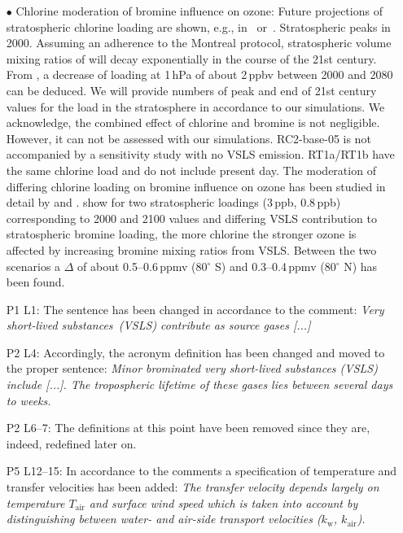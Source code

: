 \begin{itemize}
\begin{itemize}
  \item[$\bullet$]{\color{blue}Chlorine moderation of bromine influence on ozone:} Future projections of stratospheric chlorine loading are shown, e.g., in~\citet[][Chap. 12]{IPCC2013} or~\citet[][Chap.2]{WMO2014}. Stratospheric  peaks in 2000. Assuming an adherence to the Montreal protocol, stratospheric volume mixing ratios of  will decay exponentially in the course of the 21st century. From \citet[][Chap.2, Fig. 2--21]{WMO2014}, a decrease of  loading at 1\,\unit{hPa} of about 2\,\unit{ppbv} between 2000 and 2080 can be deduced. We will provide numbers of peak and end of 21st century values for the  load in the stratosphere in accordance to our simulations. We acknowledge, the combined effect of chlorine and bromine is not negligible. However, it can not be assessed with our simulations. RC2-base-05 is not accompanied by a sensitivity study with no VSLS emission. RT1a/RT1b have the same chlorine load and do not include present day. The moderation of differing chlorine loading on bromine influence on ozone has been studied in detail by \citet{ACP:Yang2014} and \citet{GRL:Sinnhuber2015}. \citet{ACP:Yang2014} show for two stratospheric  loadings (3\,\unit{ppb}, 0.8\,\unit{ppb}) corresponding to 2000 and 2100 values and differing VSLS contribution to stratospheric bromine loading, the more chlorine the stronger ozone is affected by increasing bromine mixing ratios from VSLS. Between the two  scenarios a $\Delta$ of about 0.5--0.6\,\unit{ppmv} (80$^\circ$ S) and 0.3--0.4\,\unit{ppmv} (80$^\circ$ N) has been found. 
  \item[]{\color{blue}P1 L1:} The sentence has been changed in accordance to the comment: \emph{Very short-lived substances~(VSLS) contribute as source gases [...]}
  \item[]{\color{blue}P2 L4:} Accordingly, the acronym definition has been changed and moved to the proper sentence: \emph{Minor brominated very short-lived substances (VSLS) include [...]. The tropospheric lifetime of these gases lies between several days to weeks.}
  \item[]{\color{blue}P2 L6--7:} The definitions at this point have been removed since they are, indeed, redefined later on.
  \item[]{\color{blue}P5 L12--15:} In accordance to the comments a specification of temperature and transfer velocities has been added: \emph{The transfer velocity depends largely on temperature $T_\text{air}$ and surface wind speed which is taken into account by distinguishing between water- and air-side transport velocities ($k_\text{w}$, $k_\text{air}$).}
  \end{itemize}
\end{itemize}
\newpage
%

